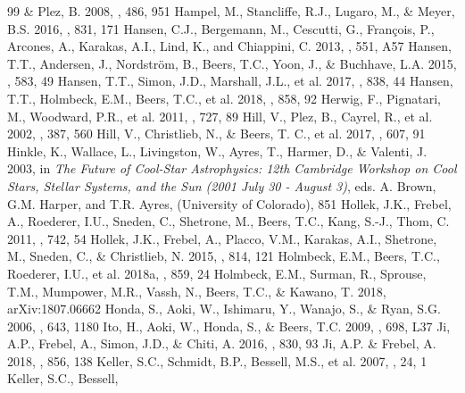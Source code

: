 \documentclass[preprint]{aastex61}
\begin{document}
{\begin{thebibliography}{99}
  \& Plez, B. 2008, \aap, 486, 951
 Hampel, M., Stancliffe,
  R.J., Lugaro, M., \& Meyer, B.S. 2016, \apj, 831, 171
 Hansen, C.J., Bergemann,
  M., Cescutti, G., Fran\c{c}ois, P., Arcones, A., Karakas, A.I.,
  Lind, K., and Chiappini, C. 2013, \aap, 551, A57
 Hansen, T.T., Andersen, J.,
  Nordstr\"{o}m, B., Beers, T.C., Yoon, J., \& Buchhave, L.A. 2015,
  \aap, 583, 49
 Hansen, T.T., Simon, J.D.,
  Marshall, J.L., et al. 2017, \apj, 838, 44
 Hansen, T.T., Holmbeck,
  E.M., Beers, T.C., et al. 2018, \apj, 858, 92
 Herwig, F., Pignatari, M.,
  Woodward, P.R., et al. 2011, \apj, 727, 89
 Hill, V., Plez, B., Cayrel, R.,
  et al. 2002, \aap, 387, 560
 Hill, V., Christlieb, N., \&
  Beers, T. C., et al. 2017, \aap, 607, 91
 Hinkle, K., Wallace, L.,
Livingston, W., Ayres, T., Harmer, D., \& Valenti, J. 2003, 	
in \textit{The Future of Cool-Star Astrophysics: 12th Cambridge
Workshop on Cool Stars, Stellar Systems, and the Sun (2001 July 30 -
August 3)}, eds. A. Brown, G.M. Harper, and T.R. Ayres, (University of
Colorado), 851
 Hollek, J.K., Frebel, A.,
  Roederer, I.U., Sneden, C., Shetrone, M., Beers, T.C., Kang, S.-J.,
  Thom, C. 2011, \apj, 742, 54
 Hollek, J.K., Frebel, A.,
  Placco, V.M., Karakas, A.I., Shetrone, M., Sneden, C., \&
  Christlieb, N. 2015, \apj, 814, 121
 Holmbeck, E.M., Beers,
  T.C., Roederer, I.U., et al. 2018a, \apj, 859, 24
 Holmbeck, E.M.,
  Surman, R., Sprouse, T.M., Mumpower, M.R., Vassh, N., Beers, T.C.,
  \& Kawano, T. 2018, arXiv:1807.06662
 Honda, S., Aoki, W.,
  Ishimaru, Y., Wanajo, S., \& Ryan, S.G. 2006, \apj, 643, 1180
 Ito, H., Aoki, W., Honda, S., \&
  Beers, T.C. 2009, \apjl, 698, L37
 Ji, A.P., Frebel, A., Simon, J.D.,
  \& Chiti, A. 2016, \apj, 830, 93
 Ji, A.P. \& Frebel, A. 2018, \apj, 856, 138
 Keller, S.C., Schmidt,
  B.P., Bessell, M.S., et al. 2007, \pasa, 24, 1
 Keller, S.C., Bessell,

\end{thebibliography}}
\end{document}
